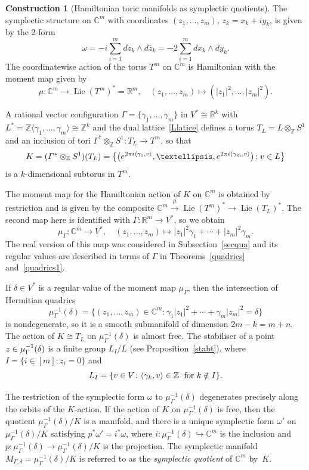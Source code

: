 \documentclass[a4paper]{amsart}
\theoremstyle{definition}
\newtheorem{construction}[theorem]{Construction}
\theoremstyle{remark}
\numberwithin{equation}{section}
\def\R{\mathbb R}
\def\C{\mathbb C}
\def\R{\mathbb R}
\def\Z{\mathbb Z}
\newcommand{\mb}[1]{{\textbf {\textit#1}}}
\newcommand{\<}{\langle}
\renewcommand{\>}{\rangle}
\begin{document}
\begin{construction}[Hamiltonian toric manifolds as symplectic quotients]
The symplectic structure on $\C^m$ with coordinates $(z_1,\ldots,z_m)$, $z_k=x_k+iy_k$, is given by the $2$-form
\[
  \omega=-i\sum_{i=1}^m dz_k\wedge d\overline z_k=-2\sum_{i=1}^m dx_k\wedge dy_k.
\]  
The coordinatewise action of the torus $T^m$ on $\C^m$ is Hamiltonian with the moment map given by
\[
  \mu\colon\C^m\to\mathop\mathrm{Lie}(T^m)^*=\R^m,\quad
  (z_1,\ldots,z_m)\mapsto(|z_1|^2,\ldots,|z_m|^2).
\]

A rational vector configuration $\Gamma=\{\gamma_1,\ldots,\gamma_m\}$ in $V^*\cong\R^k$ with $L^*=\Z\langle\gamma_1,\ldots,\gamma_m\rangle\cong\Z^k$ and the dual lattice~\eqref{Llatice} defines a torus $T_L=L\otimes_\Z S^1$ and an inclusion of tori $\varGamma^*\otimes_\Z S^1\colon T_L\to T^m$, so that
\begin{equation}\label{Ktorus}
  K=(\varGamma^*\otimes_\Z S^1)(T_L)=
  \bigl\{\bigl(e^{2\pi i\langle\gamma_1,\mb v\rangle},\ldots,
  e^{2\pi i\langle\gamma_m,\mb v\rangle}\bigr)\colon \mb v\in L  \bigr\}
\end{equation}
is a $k$-dimensional subtorus in $T^m$. 

The moment map for the Hamiltonian action of $K$ on $\C^m$ is obtained by restriction and is given by the composite $\C^m\stackrel\mu{\longrightarrow}\mathop\mathrm{Lie}(T^m)^*\to\mathop\mathrm{Lie}(T_L)^*$. The second map here is identified with $\varGamma\colon\R^m\to V^*$, so we obtain
\[
  \mu_\Gamma\colon\C^m\to V^*, \quad (z_1,\ldots,z_m)\mapsto     
  |z_1|^2\gamma_1+ \cdots+|z_m|^2\gamma_m.
\]
The real version of this map was considered in Subsection~\ref{secqua} and its regular values are described in terms of $\Gamma$ in Theorems~\ref{quadrics} and~\ref{quadrics1}.

If $\delta\in V^*$ is a regular value of the moment map $\mu_\Gamma$, then
the intersection of Hermitian quadrics
\[
  \mu_\Gamma^{-1}(\delta)=\{(z_1,\ldots,z_m)\in\C^m\colon
  \gamma_1 |z_1|^2+\cdots+\gamma_m|z_m|^2=\delta\}
\]
is nondegenerate, so it is a smooth submanifold of dimension $2m-k=m+n$. The action of $K\cong T_L$ on $\mu_\Gamma^{-1}(\delta)$ is almost free. The stabiliser of a point $\mb z\in\mu_\Gamma^{-1}(\delta)$ is a finite group $L_I/L$ (see Proposition~\ref{stabt}), where $I=\{i\in[m]\colon z_i=0\}$ and
\[
  L_I
  =\{\mb v\in V\colon\langle\gamma_k,\mb v\rangle\in\Z\;\text{ for }k\notin I\}.
\]

The restriction of the symplectic form $\omega$ to $\mu_\Gamma^{-1}(\delta)$ degenerates precisely along the orbits of the $K$-action.
If the action of $K$ on $\mu_\Gamma^{-1}(\delta)$ is free, then the quotient $\mu_\Gamma^{-1}(\delta)/K$ is a manifold, and there is a unique symplectic form $\omega'$ on $\mu_\Gamma^{-1}(\delta)/K$ satisfying $p^*\omega'=i^*\omega$, where $i\colon\mu_\Gamma^{-1}(\delta)\hookrightarrow\C^m$ is the inclusion and $p\colon \mu_\Gamma^{-1}(\delta)\to\mu_\Gamma^{-1}(\delta)/K$ is the projection. The symplectic manifold $M_{\Gamma,\delta}=\mu_\Gamma^{-1}(\delta)/K$ is referred to as the \emph{symplectic quotient} of $\C^m$ by~$K$.  


\end{construction}
\end{document}
